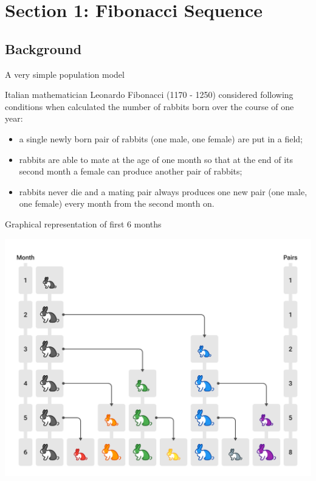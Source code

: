\section{Section 1: Fibonacci Sequence}
\subsection{Background}
\begin{frame}{A very simple population model}


Italian mathematician Leonardo Fibonacci (1170 - 1250)  considered following conditions when calculated the number of rabbits born over the course of one year:
\vspace{1em}
\begin{itemize}
    \item a single newly born pair of rabbits (one male, one female) are put in a field;
    \item rabbits are able to mate at the age of one month so that at the end of its second month a female can produce another pair of rabbits;
    \item rabbits never die and a mating pair always produces one new pair (one male, one female) every month from the second month on.
\end{itemize}
 
\end{frame} 

\begin{frame}{Graphical representation of first 6 months}
\begin{center}
    \includegraphics[scale = 0.2]{lesson_1/images/fibonacci_rabbits.png}
\end{center}
\end{frame}

